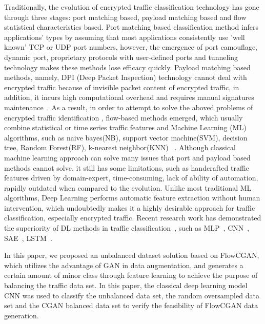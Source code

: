 \documentclass[conference]{IEEEtran}
\begin{document}
Traditionally, the evolution of encrypted traffic classification technology has gone through three stages: port matching based, payload matching based and flow statistical characteristics based. Port matching based classification method infers applications' types by assuming that most applications consistently use 'well known' TCP or UDP port numbers, however, the emergence of port camouflage, dynamic port, proprietary protocols with user-defined ports and tunneling technology makes these methods lose efficacy quickly. Payload matching based methods, namely, DPI (Deep Packet Inspection) technology cannot deal with encrypted traffic because of invisible packet content of encrypted traffic, in addition, it incurs high computational overhead and requires manual signatures maintenance~\cite{Finsterbusch2014,SDN-HGU,PhoneNumber}. As a result, in order to attempt to solve the aboved problems of encrypted traffic identification , flow-based methods emerged, which usually combine statistical or time series traffic features and Machine Learning (ML) algorithms,  such as naive bayes(NB), support vector machine(SVM), decision tree, Random Forest(RF), k-nearest neighbor(KNN) ~\cite{Pescape2008,Sun2010,Velan2015,Arndt2011}. Although classical machine learning approach can solve many issues that port and payload based methods cannot solve, it still has some limitations, such as handcrafted traffic features driven by domain-expert, time-consuming, lack of ability of automation, rapidly outdated when compared to the evolution. Unlike most traditional ML algorithms, Deep Learning performs automatic feature extraction without human intervention, which undoubtedly makes it a highly desirable approach for traffic classification, especially encrypted traffic.  Recent research work has demonstrated the superiority of DL methods in traffic classification~\cite{MobileTC-2018}, such as MLP~\cite{Datanet}, CNN~\cite{deeppacket,Wang-1D-CNN,Wang2D-CNN,Seq2Img,HierarchicalTC}, SAE~\cite{blackhat}, LSTM~\cite{IoT-CNN-2017,HAST-IDS}. 


In this paper, we proposed an unbalanced dataset solution based on FlowCGAN, which utilizes the advantage of GAN in data augmentation, and generates a certain amount of minor class through feature learning to achieve the purpose of balancing the traffic data set. In this paper, the classical deep learning model CNN was used to classify the unbalanced data set, the random oversampled data set and the CGAN balanced data set to verify the feasibility of FlowCGAN data generation.
\end{document}
